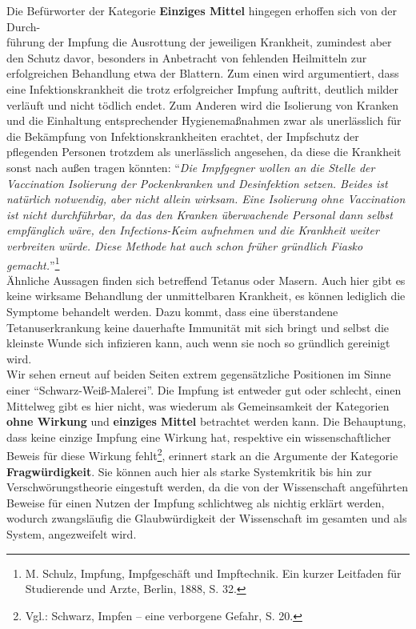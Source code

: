 \documentclass[
    a4paper,
    12pt,
    hyphens,
    chapterprefix=true,
    headheight=33pt,
    footheight=29pt,
    headings=optiontohead, %
]{scrartcl}
\begin{document}
{Die Befürworter der Kategorie \textbf{Einziges Mittel} hingegen erhoffen sich von der Durch-\\führung der Impfung die Ausrottung der jeweiligen Krankheit, zumindest aber den Schutz davor, besonders in Anbetracht von fehlenden Heilmitteln zur erfolgreichen Behandlung etwa der Blattern. Zum einen wird argumentiert, dass eine Infektionskrankheit die trotz erfolgreicher Impfung auftritt, deutlich milder verläuft und nicht tödlich endet. Zum Anderen wird die Isolierung von Kranken und die Einhaltung entsprechender Hygienemaßnahmen zwar als unerlässlich für die Bekämpfung von Infektionskrankheiten erachtet, der Impfschutz der pflegenden Personen trotzdem als unerlässlich angesehen, da diese die Krankheit sonst nach außen tragen könnten: "`\textit{Die Impfgegner wollen an die Stelle der Vaccination Isolierung der Pockenkranken und Desinfektion setzen. Beides ist natürlich notwendig, aber nicht allein wirksam. Eine Isolierung ohne Vaccination ist nicht durchführbar, da das den Kranken überwachende Personal dann selbst empfänglich wäre, den Infections-Keim aufnehmen und die Krankheit weiter verbreiten würde. Diese Methode hat auch schon früher gründlich Fiasko gemacht.}"'\footnote{M. Schulz, Impfung, Impfgeschäft und Impftechnik. Ein kurzer Leitfaden für Studierende und Arzte, Berlin, 1888, S. 32.}\\
Ähnliche Aussagen finden sich betreffend Tetanus oder Masern. Auch hier gibt es keine wirksame Behandlung der unmittelbaren Krankheit, es können lediglich die Symptome behandelt werden. Dazu kommt, dass eine überstandene Tetanuserkrankung keine dauerhafte Immunität mit sich bringt und selbst die kleinste Wunde sich infizieren kann, auch wenn sie noch so gründlich gereinigt wird.\\
Wir sehen erneut auf beiden Seiten extrem gegensätzliche Positionen im Sinne einer "`Schwarz-Weiß-Malerei"'. Die Impfung ist entweder gut oder schlecht, einen Mittelweg gibt es hier nicht, was wiederum als Gemeinsamkeit der Kategorien \textbf{ohne Wirkung} und \textbf{einziges Mittel} betrachtet werden kann. Die Behauptung, dass keine einzige Impfung eine Wirkung hat, respektive ein wissenschaftlicher Beweis für diese Wirkung fehlt\footnote{Vgl.: Schwarz, Impfen -- eine verborgene Gefahr, S. 20.}, erinnert stark an die Argumente der Kategorie \textbf{Fragwürdigkeit}. Sie können auch hier als starke Systemkritik bis hin zur Verschwörungstheorie eingestuft werden, da die von der Wissenschaft angeführten Beweise für einen Nutzen der Impfung schlichtweg als nichtig erklärt werden, wodurch zwangsläufig die Glaubwürdigkeit der Wissenschaft im gesamten und als System, angezweifelt wird.



}
\end{document}
